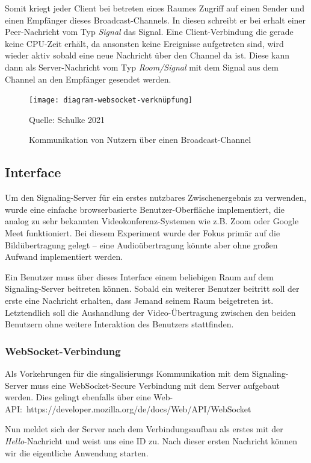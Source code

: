 \documentclass{article}
\newcommand{\figuresource}[1]{
	\begin{center}Quelle: #1\end{center}
}
\begin{document}
\begin{onecolumn}
Somit kriegt jeder Client bei betreten eines Raumes Zugriff auf einen Sender
und einen Empfänger dieses Broadcast-Channels. In diesen schreibt er bei erhalt
einer Peer-Nachricht vom Typ \textit{Signal} das Signal. Eine Client-Verbindung
die gerade keine CPU-Zeit erhält, da ansonsten keine Ereignisse aufgetreten
sind, wird wieder aktiv sobald eine neue Nachricht über den Channel da ist.
Diese kann dann als Server-Nachricht vom Typ \textit{Room/Signal} mit dem
Signal aus dem Channel an den Empfänger gesendet werden.

\begin{figure}[ht]
	\texttt{[image: diagram-websocket-verknüpfung]}
	\centering
	\caption{Kommunikation von Nutzern über einen Broadcast-Channel}
	\figuresource{Schulke 2021}
\end{figure}

\subsection{Interface}

Um den Signaling-Server für ein erstes nutzbares Zwischenergebnis zu verwenden,
wurde eine einfache browserbasierte Benutzer-Oberfläche implementiert, die
analog zu sehr bekannten Videokonferenz-Systemen wie z.B. Zoom oder Google Meet
funktioniert. Bei diesem Experiment wurde der Fokus primär auf die
Bildübertragung gelegt – eine Audioübertragung könnte aber ohne großen Aufwand
implementiert werden.

Ein Benutzer muss über dieses Interface einem beliebigen Raum auf dem
Signaling-Server beitreten können. Sobald ein weiterer Benutzer beitritt soll
der erste eine Nachricht erhalten, dass Jemand seinem Raum beigetreten ist.
Letztendlich soll die Aushandlung der Video-Übertragung zwischen den beiden
Benutzern ohne weitere Interaktion des Benutzers stattfinden.

\subsubsection{WebSocket-Verbindung}

Als Vorkehrungen für die singalisierungs Kommunikation mit dem Signaling-Server
muss eine WebSocket-Secure Verbindung mit dem Server aufgebaut werden. Dies
gelingt ebenfalls über eine Web-API:\
https://developer.mozilla.org/de/docs/Web/API/WebSocket

Nun meldet sich der Server nach dem Verbindungsaufbau als erstes mit der
\textit{Hello}-Nachricht und weist uns eine ID zu. Nach dieser ersten Nachricht
können wir die eigentliche Anwendung starten.


\end{onecolumn}
\end{document}
